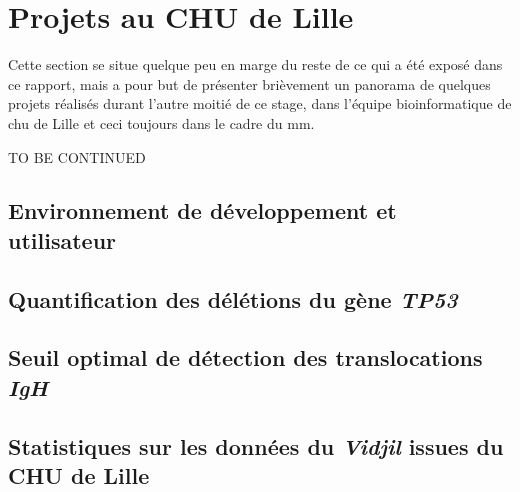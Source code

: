 \chapter{Projets au CHU de Lille}

Cette section se situe quelque peu en marge du reste de ce qui a été exposé dans ce rapport, mais a pour 
but de présenter brièvement un panorama de quelques projets réalisés durant l'autre moitié de ce stage, 
dans l'équipe bioinformatique de \gls{chu} de Lille et ceci toujours dans le cadre du \gls{mm}.

TO BE CONTINUED

\section{Environnement de développement et utilisateur}

\section{Quantification des délétions du gène \textit{TP53}}

\section{Seuil optimal de détection des translocations \textit{IgH}}

\section{Statistiques sur les données du \textit{Vidjil} issues du CHU de Lille}